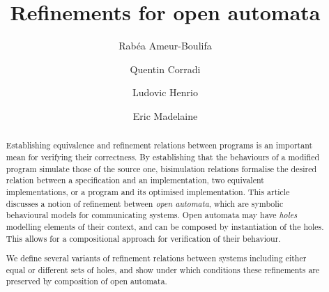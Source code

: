 \documentclass[runningheads]{llncs}
\begin{document}
%
\title{Refinements for open automata}



%
%
\author{
Rabéa Ameur-Boulifa \and
Quentin Corradi \and
Ludovic Henrio  \and
Eric Madelaine }
%
%
%
\maketitle              %
%
\begin{abstract}

Establishing equivalence and refinement relations between programs is an important mean for 
verifying their correctness. By establishing that the
behaviours of a modified program simulate those of the source one, bisimulation relations formalise the desired relation between a specification and an implementation, 
 two equivalent implementations, or a program and its optimised implementation.
This article discusses a notion of refinement between \emph{open automata}, which are symbolic
behavioural models for communicating systems. 
Open automata may have \emph{holes} modelling elements of their
context, and can be composed by instantiation of the holes. This allows for a compositional approach for
verification of their behaviour.

We define several variants of refinement relations between systems including either equal or different sets of holes, and 
show under which conditions these refinements are preserved by composition of open automata. 


\end{abstract}
%
%
%
\end{document}
